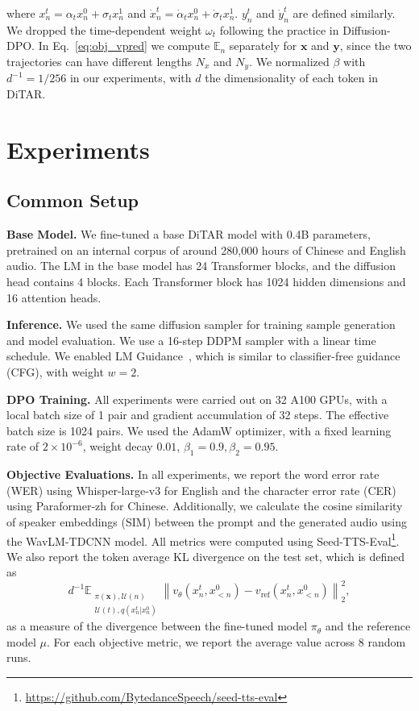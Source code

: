 \documentclass{article}
\begin{document}
where $x_n^t = \alpha_t x_n^0 + \sigma_t x_n^1$ and $\dot x_n^t = \dot \alpha_t x_n^0 + \dot \sigma_t x_n^1$. $y_n^t$ and $\dot y_n^t$ are defined similarly. We dropped the time-dependent weight $\omega_t$ following the practice in Diffusion-DPO. In Eq.~\eqref{eq:obj_vpred} we compute $\mathbb E_n$ separately for $\mathbf x$ and $\mathbf y$, since the two trajectories can have different lengths $N_x$ and $N_y$. We normalized $\beta$ with $d^{-1} = 1/256$ in our experiments, with $d$ the dimensionality of each token in DiTAR.

\section{Experiments}
\label{sec:experiments}

\subsection{Common Setup}

\textbf{Base Model.} We fine-tuned a base DiTAR model with 0.4B parameters, pretrained on an internal corpus of around 280,000 hours of Chinese and English audio. The LM in the base model has 24 Transformer blocks, and the diffusion head contains 4 blocks. Each Transformer block has 1024 hidden dimensions and 16 attention heads.

\noindent
\textbf{Inference.} We used the same diffusion sampler for training sample generation and model evaluation. We use a 16-step DDPM sampler with a linear time schedule. We enabled LM Guidance~\cite{DiTAR}, which is similar to classifier-free guidance (CFG), with weight $w = 2$.

\noindent
\textbf{DPO Training.} All experiments were carried out on 32 A100 GPUs, with a local batch size of 1 pair and gradient accumulation of 32 steps. The effective batch size is 1024 pairs. We used the AdamW optimizer, with a fixed learning rate of $2 \times 10^{-6}$, weight decay $0.01$, $\beta_1 = 0.9, \beta_2 = 0.95$.

\noindent
\textbf{Objective Evaluations.} In all experiments, we report the word error rate (WER) using Whisper-large-v3 for English and the character error rate (CER) using Paraformer-zh for Chinese. Additionally, we calculate the cosine similarity of speaker embeddings (SIM) between the prompt and the generated audio using the WavLM-TDCNN model. All metrics were computed using Seed-TTS-Eval\footnote{\href{https://github.com/BytedanceSpeech/seed-tts-eval}{https://github.com/BytedanceSpeech/seed-tts-eval}}. We also report the token average KL divergence on the test set, which is defined as
\begin{equation}
d^{-1}\mathbb E_{\substack{\pi(\mathbf x), \mathcal U (n) \\ \mathcal U(t), q(x_n^t | x_n^0)}} \left \| v_\theta(x_n^t, x_{<n}^0) - v_{\mathrm{ref}}(x_n^t, x_{<n}^0)\right \|_2^2, 
\end{equation}
as a measure of the divergence between the fine-tuned model $\pi_\theta$ and the reference model $\mu$. For each objective metric, we report the average value across 8 random runs.
\end{document}
